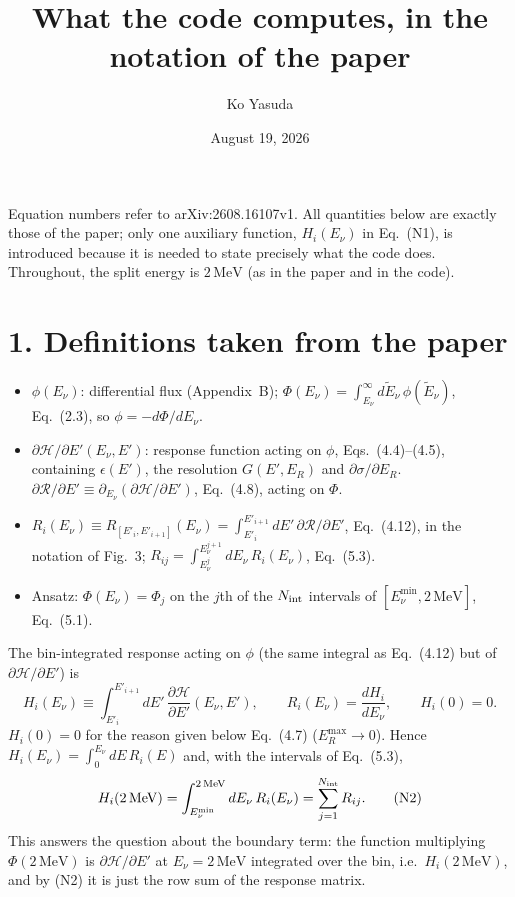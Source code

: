 \documentclass[11pt,a4paper]{article}
\title{\vspace{-12mm}What the code computes, in the notation of the paper\vspace{-2mm}}
\author{Ko Yasuda}
\date{August 19, 2026}
\newcommand{\Ev}{E_\nu}
\newcommand{\Ep}{E'}
\newcommand{\cR}{\mathcal{R}}
\newcommand{\cH}{\mathcal{H}}
\newcommand{\Rb}[1]{R_{#1}}
\newcommand{\Hb}[1]{H_{#1}}
\newcommand{\Etwo}{2\,\mathrm{MeV}}
\begin{document}
\maketitle
\vspace{-9mm}
Equation numbers refer to arXiv:2608.16107v1. All quantities below are exactly those of the paper; only one
auxiliary function, $H_i(\Ev)$ in Eq.~(N1), is introduced because it is needed to state precisely what the code does.
Throughout, the split energy is $\Etwo$ (as in the paper and in the code).

\section*{1. Definitions taken from the paper}
\begin{itemize}\itemsep1pt
\item $\phi(\Ev)$: differential flux (Appendix~B); $\Phi(\Ev)=\int_{\Ev}^\infty d\tilde E_\nu\,\phi(\tilde E_\nu)$, Eq.~(2.3), so $\phi=-d\Phi/d\Ev$.
\item $\partial\cH/\partial\Ep(\Ev,\Ep)$: response function acting on $\phi$, Eqs.~(4.4)--(4.5), containing $\epsilon(\Ep)$, the resolution
$G(\Ep,E_R)$ and $\partial\sigma/\partial E_R$. $\partial\cR/\partial\Ep\equiv\partial_{\Ev}(\partial\cH/\partial\Ep)$, Eq.~(4.8), acting on $\Phi$.
\item $R_i(\Ev)\equiv R_{[E'_i,E'_{i+1}]}(\Ev)=\int_{E'_i}^{E'_{i+1}}d\Ep\,\partial\cR/\partial\Ep$, Eq.~(4.12), in the notation of Fig.~3;
$R_{ij}=\int_{\Ev^j}^{\Ev^{j+1}}d\Ev\,R_i(\Ev)$, Eq.~(5.3).
\item Ansatz: $\Phi(\Ev)=\Phi_j$ on the $j$th of the $N_{\rm int}$ intervals of $[\Ev^{\min},\Etwo]$, Eq.~(5.1).
\end{itemize}
The bin-integrated response acting on $\phi$ (the same integral as Eq.~(4.12) but of $\partial\cH/\partial\Ep$) is
\begin{equation}
\Hb{i}(\Ev)\equiv\int_{E'_i}^{E'_{i+1}}d\Ep\,\frac{\partial\cH}{\partial\Ep}(\Ev,\Ep),
\qquad
\Rb{i}(\Ev)=\frac{d\Hb{i}}{d\Ev},\qquad \Hb{i}(0)=0 .
\tag{N1}
\end{equation}
$H_i(0)=0$ for the reason given below Eq.~(4.7) ($E_R^{\max}\to0$). Hence $H_i(\Ev)=\int_0^{\Ev}dE\,R_i(E)$ and, with the
intervals of Eq.~(5.3),
\begin{equation}
\Hb{i}(\Etwo)=\int_{\Ev^{\min}}^{\Etwo}d\Ev\,\Rb{i}(\Ev)=\sum_{j=1}^{N_{\rm int}}R_{ij}.
\tag{N2}
\end{equation}
This answers the question about the boundary term: the function multiplying $\Phi(\Etwo)$ is $\partial\cH/\partial\Ep$ at
$\Ev=\Etwo$ integrated over the bin, i.e.\ $\Hb{i}(\Etwo)$, and by (N2) it is just the row sum of the response matrix.
\end{document}
